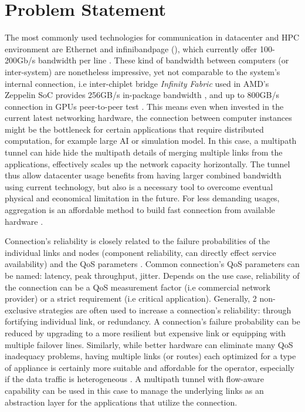 \section{Problem Statement}\label{sec:introduction:problem_statement}
The most commonly used technologies for communication in datacenter and \ac{HPC} environment are Ethernet and \ac{infinibandpage} (), which currently offer 100-200Gb/s bandwidth per line \cite{ethernet_roadmap}\cite{infiniband_roadmap}.
These kind of bandwidth between computers (or inter-system) are nonetheless impressive, yet not comparable to the system's internal connection, i.e inter-chiplet bridge \textit{Infinity Fabric} used in AMD's Zeppelin SoC provides 256GB/s in-package bandwidth \cite{burd_zeppelin_2019}, and up to 800GB/s connection in GPUs peer-to-peer test \cite{amd_infinity_architecture}.
This means even when invested in the current latest networking hardware, the connection between computer instances might be the bottleneck for certain applications that require distributed computation, for example large \ac{AI} or simulation model.
In this case, a multipath tunnel can hide hide the multipath details of merging multiple links from the applications, effectively scales up the network capacity horizontally.
The tunnel thus allow datacenter usage benefits from having larger combined bandwidth using current technology, but also is a necessary tool to overcome eventual physical and economical limitation in the future.
For less demanding usages, aggregation is an affordable method to build fast connection from available hardware .

Connection's reliability is closely related to the failure probabilities of the individual links and nodes (component reliability, can directly effect service availability) \cite{shooman_algorithms_1995} and the \ac{QoS} parameters \cite{gozdecki_quality_2003}.
Common connection's \ac{QoS}  parameters can be named: latency, peak throughput, jitter.
Depends on the use case, reliability of the connection can be a \ac{QoS} measurement factor (i.e commercial network provider) or a strict requirement (i.e critical application).
Generally, 2 non-exclusive strategies are often used to increase a connection's reliability: through fortifying individual link, or redundancy.
A connection's failure probability can be reduced by upgrading to a more resilient but expensive link or equipping with multiple failover lines. 
Similarly, while better hardware can eliminate many \ac{QoS} inadequacy problems, having multiple links (or routes) each optimized for a type of appliance is certainly more suitable and affordable for the operator, especially if the data traffic is heterogeneous \cite{chen_overview_1998}.
A multipath tunnel with flow-aware capability can be used in this case to manage the underlying links as an abstraction layer for the applications that utilize the connection.  

